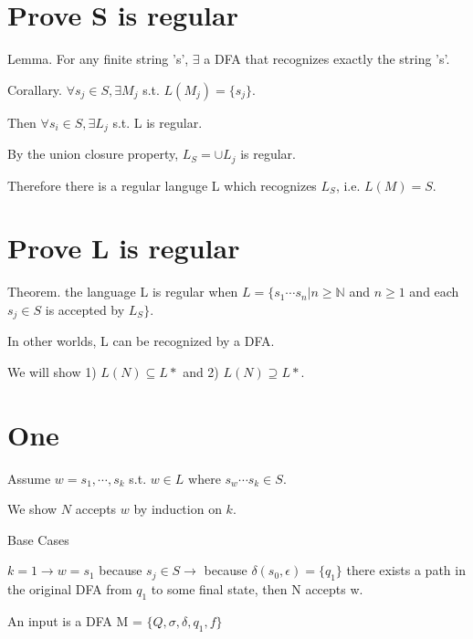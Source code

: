 \documentclass[11pt,addpoints,answers]{exam}
\newcommand{\N}{\mathbb{N}} %
\newcommand{\1}{\mathbf{1}}
\begin{document}
\pagestyle{head}                %

\medskip
 
\section{Prove S is regular}

\noindent Lemma. For any finite string 's', $\exists$ a DFA that recognizes exactly the string 's'.

\noindent Corallary. $\forall s_j \in S, \exists M_j$ s.t. $L(M_j) = \{s_j\}$.


\noindent Then $\forall s_i \in S, \exists L_j$ s.t. L is regular.

\noindent By the union closure property, $ L_S = \cup L_j$ is regular.

\noindent Therefore there is a regular languge L which recognizes $L_S$, i.e. $L(M) = S$.

\section{Prove L is regular}

\noindent Theorem. the language L is regular when $L = \{s_1 \cdots s_n | n \geq \N$ and $n \geq 1$ and each $s_j \in S$ is accepted by $L_S \}$.

\noindent In other worlds, L can be recognized by a DFA.

\noindent We will show 1) $L(N) \subseteq L*$ and 2) $L(N) \supseteq L*$.

\section{One}

\noindent Assume $w = s_1, \cdots, s_k$ s.t. $w \in L$ where $s_w \cdots s_k \in S$.

\noindent We show $N$ accepts $w$ by induction on $k$.

\noindent Base Cases

\noindent $k = 1 \to w = s_1$ because $s_j \in S \to$ because $\delta(s_0, \epsilon) = \{ q_1 \}$ there exists a path in the original DFA from $q_1$ to some final state, then N accepts w.

\noindent An input is a DFA M = $\{Q, \sigma, \delta, q_1, f \}$
\end{document}
